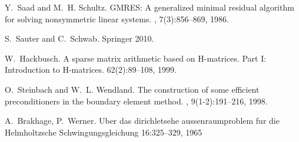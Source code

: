 \documentclass[]{article}
\begin{document}
\begin{thebibliography}{0}
	Y.~Saad and M.~H. Schultz.
	\newblock GMRES: A generalized minimal residual algorithm for solving
	nonsymmetric linear systems.
	,
	7(3):856--869, 1986.
	
	S.~Sauter and C.~Schwab.
	\newblock Springer 2010.
	
	
	W.~Hackbusch.
	\newblock A sparse matrix arithmetic based on H-matrices. Part I: Introduction to H-matrices.
	 62(2):89--108, 1999.
	
	O.~Steinbach and W.~L. Wendland.
	\newblock The construction of some efficient preconditioners in the boundary
	element method.
	, 9(1-2):191--216, 1998.
	
	
	A.~Brakhage, P.~Werner.
	\newblock Uber das dirichletsehe aussenraumproblem fur die Helmholtzsche Schwingungsgleichung
	 16:325–329, 1965
	
\end{thebibliography}
\end{document}
